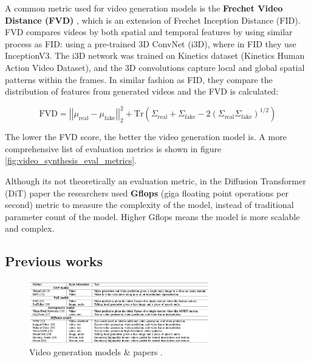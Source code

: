 A common metric used for video generation models is the \textbf{Frechet Video Distance (FVD)} \cite{fvd}, which is an extension of Frechet Inception Distance (FID). FVD compares videos by both spatial and temporal features by using similar process as FID: using a pre-trained 3D ConvNet (i3D), where in FID they use InceptionV3. The i3D network was trained on Kinetics dataset (Kinetics Human Action Video Dataset), and the 3D convolutions capture local and global spatial patterns within the frames. In similar fashion as FID, they compare the distribution of features from generated videos and the FVD is calculated:

\begin{equation*}
    \text{FVD} = \left| \left| \mu_{\text{real}} - \mu_{\text{fake}} \right| \right|^2_2 + \text{Tr} \left( \Sigma_{\text{real}} + \Sigma_{\text{fake}} - 2 \left( \Sigma_{\text{real}} \Sigma_{\text{fake}} \right)^{1/2} \right)
\end{equation*}

The lower the FVD score, the better the video generation model is. A more comprehensive list of evaluation metrics is shown in figure \ref{fig:video_synthesis_eval_metrics}.

Although its not theoretically an evaluation metric, in the Diffusion Transformer (DiT) paper \cite{diffusion_transformer} the researchers used \textbf{Gflops} (giga floating point operations per second) metric to measure the complexity of the model, instead of traditional parameter count of the model. Higher Gflops means the model is more scalable and complex.



\subsection{Previous works}

\begin{figure}
    \centering
    \includegraphics[width=0.7\textwidth]{images/video_synthesis/previous_works.png}
    \caption{Video generation models \& papers \cite{zhou2024survey}.}
\end{figure}

